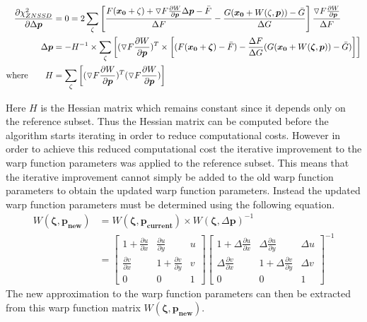 \documentclass[[12pt,oneside,openany,a4paper, %
\newcommand*\mean[1]{\bar{#1}} %
\begin{document}
\begin{align}
  \frac{\partial \chi_{ZNSSD}^2}{\partial \Delta \bm{p}} &= 0 = 2 \sum_{\zeta}  \left[ \frac{F(\bm{x_0}+\zeta)+\triangledown F \frac{\partial W}{\partial \bm{p}} \Delta\bm{p}-\mean{F}}{\Delta F} -\frac{G(\bm{x_0}+W(\zeta,\bm{p}))-\mean{G}}{\Delta G}\right] \frac{\triangledown F \frac{\partial W}{\partial \bm{p}}}{\Delta F}\\
  \Delta \bm{p} &= - H^{-1} \times \sum_{\zeta} \left[ (\triangledown F \frac{\partial W}{\partial \bm{p}})^T \times \left[ (F(\bm{x_0} + \bm{\zeta}) - \mean{F}) - \frac{\Delta F}{\Delta G}(G(\bm{x_0}+W(\bm{\zeta}, \bm{p}))-\mean{G}) \right] \right]
  \label{eq:delta p} \\
  \text{where} \qquad H &= \sum_{\zeta} \left[ (\triangledown F \frac{\partial W}{\partial \bm{p}})^T (\triangledown F \frac{\partial W}{\partial \bm{p}}) \right]
\end{align}

Here $H$ is the Hessian matrix which remains constant since it depends only on the reference subset. Thus the Hessian matrix can be computed before the algorithm starts iterating in order to reduce computational costs. However in order to achieve this reduced computational cost the iterative improvement to the warp function parameters was applied to the reference subset. This means that the iterative improvement cannot simply be added to the old warp function parameters to obtain the updated warp function parameters. Instead the updated warp function parameters must be determined using the following equation.
\begin{align}
  W(\bm{\zeta},\bm{p_{new}})&=W(\bm{\zeta},\bm{p_{current}})\times W(\bm{\zeta},\Delta \bm{p})^{-1}\\
  &=\begin{bmatrix}
  1+\frac{\partial u}{\partial x} & \frac{\partial u}{\partial y} & u\\
  \frac{\partial v}{\partial x} & 1+\frac{\partial v}{\partial y} & v \\
  0 & 0 & 1
  \end{bmatrix}
  \begin{bmatrix}
  1+\Delta \frac{\partial u}{\partial x} & \Delta \frac{\partial u}{\partial y} & \Delta u\\
  \Delta \frac{\partial v}{\partial x} & 1+\Delta \frac{\partial v}{\partial y} & \Delta v \\
  0 & 0 & 1
  \end{bmatrix}^{-1}
  \label{eq:get new p}
\end{align}
The new approximation to the warp function parameters can then be extracted from this warp function matrix $W(\bm{\zeta},\bm{p_{new}})$.
\end{document}
